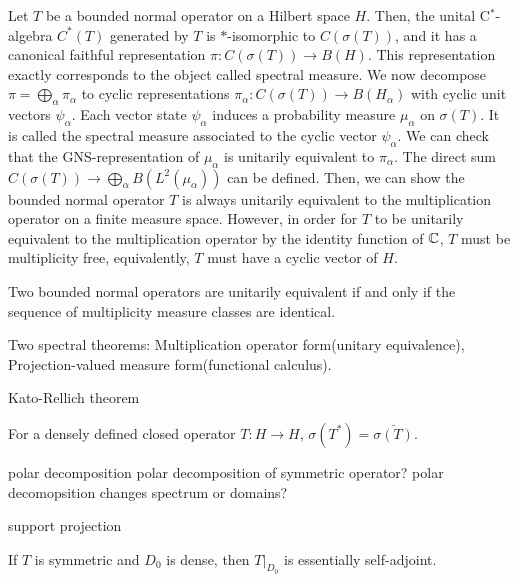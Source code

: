 \documentclass{../../large}
\begin{document}
\begin{prb}
Let $T$ be a bounded normal operator on a Hilbert space $H$.
Then, the unital C$^*$-algebra $C^*(T)$ generated by $T$ is $*$-isomorphic to $C(\sigma(T))$, and it has a canonical faithful representation $\pi:C(\sigma(T))\to B(H)$.
This representation exactly corresponds to the object called spectral measure.
We now decompose $\pi=\bigoplus_\alpha\pi_\alpha$ to cyclic representations $\pi_\alpha:C(\sigma(T))\to B(H_\alpha)$ with cyclic unit vectors $\psi_\alpha$.
Each vector state $\psi_\alpha$ induces a probability measure $\mu_\alpha$ on $\sigma(T)$.
It is called the spectral measure associated to the cyclic vector $\psi_\alpha$.
We can check that the GNS-representation of $\mu_\alpha$ is unitarily equivalent to $\pi_\alpha$.
The direct sum $C(\sigma(T))\to\bigoplus_\alpha B(L^2(\mu_\alpha))$ can be defined.
Then, we can show the bounded normal operator $T$ is always unitarily equivalent to the multiplication operator on a finite measure space.
However, in order for $T$ to be unitarily equivalent to the multiplication operator by the identity function of $\mathbb{C}$, $T$ must be multiplicity free, equivalently, $T$ must have a cyclic vector of $H$.
\end{prb}







Two bounded normal operators are unitarily equivalent if and only if the sequence of multiplicity measure classes are identical.

Two spectral theorems: Multiplication operator form(unitary equivalence), Projection-valued measure form(functional calculus).


Kato-Rellich theorem

For a densely defined closed operator $T:H\to H$, $\sigma(T^*)=\bar{\sigma(T)}$.


\begin{prb}
polar decomposition
polar decomposition of symmetric operator?
polar decomopsition changes spectrum or domains?

support projection
\end{prb}

\begin{prb}
\end{prb}

\begin{prb}
\begin{parts}
\item If $T$ is symmetric and $D_0$ is dense, then $T|_{D_0}$ is essentially self-adjoint.
\end{parts}
\end{prb}
\end{document}
